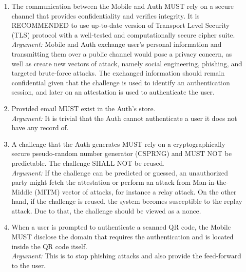 \begin{enumerate}
            \item The communication between the Mobile and Auth MUST rely on a secure channel that provides 
                confidentiality and verifies integrity. It is RECOMMENDED to use up-to-date version of 
                Transport Level Security (TLS) protocol with a well-tested and computationally secure 
                cipher suite.\\      
            \textit{Argument:} Mobile and Auth exchange user's personal information and transmitting them over a 
            public channel would pose a privacy concern, as well as create new vectors of attack, 
            namely social engineering, phishing, and targeted brute-force attacks. The exchanged information should 
            remain confidential given that the challenge is used to identify an authentication session, and later 
            on an attestation is used to authenticate the user.

            \item Provided email MUST exist in the Auth's store.\\
            \textit{Argument:} It is trivial that the Auth cannot authenticate a user it does not have any record
                               of.     

            \item A challenge that the Auth generates MUST rely on a cryptographically secure pseudo-random number 
                  generator (CSPRNG) and MUST NOT be predictable. The challenge SHALL NOT be reused.\\
            \textit{Argument:} If the challenge can be predicted or guessed, an unauthorized party might fetch the
                               attestation or perform an attack from Man-in-the-Middle (MITM) vector of attacks, for
                               instance a relay attack. On the other hand, if the challenge is reused, the system 
                               becomes susceptible to the replay attack. Due to that, the challenge should be 
                               viewed as a nonce.

            \item When a user is prompted to authenticate a scanned QR code, the Mobile MUST disclose the domain that 
                  requires the authentication and is located inside the QR code itself.\\
            \textit{Argument:} This is to stop phishing attacks and also provide the feed-forward to the user.


\end{enumerate}
